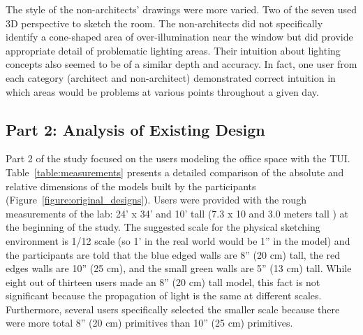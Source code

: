 \documentclass[preprint]{elsarticle}
\begin{document}
The style of the non-architects' drawings were more varied. Two of the
seven used 3D perspective to sketch the room.  The non-architects did
not specifically identify a cone-shaped area of over-illumination near
the window but did provide appropriate detail of problematic lighting
areas.  Their intuition about lighting concepts also seemed to be of a
similar depth and accuracy.  In fact, one user from each category
(architect and non-architect) demonstrated correct intuition in which
areas would be problems at various points throughout a given day.


\subsection{Part 2: Analysis of Existing Design}



Part 2 of the study focused on the users modeling the office space
with the TUI.
Table~\ref{table:measurements} presents a detailed comparison of the
absolute and relative dimensions of the models built by the
participants (Figure~\ref{figure:original_designs}).
%
Users were provided with the rough measurements of the lab: 24' x 34'
and 10' tall (7.3 x 10 and 3.0 meters tall ) at the beginning of the study.  
The suggested scale for
the physical sketching environment is 1/12 scale (so 1' in the real
world would be 1'' in the model) and the participants are told that
the blue edged walls are 8'' (20 cm) tall, the red edges walls are 10'' (25 cm), and
the small green walls are 5'' (13 cm) tall.
%
While eight out of thirteen users made an 8'' (20 cm) tall model, this fact is
not significant because the propagation of light is the same at
different scales.  Furthermore, several users specifically selected
the smaller scale because there were more total 8'' (20 cm) primitives than
10'' (25 cm) primitives.
%


\end{document}
